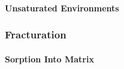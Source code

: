 \paragraph{Unsaturated Environments}

\subsubsection{Fracturation}






\paragraph{Sorption Into Matrix}




